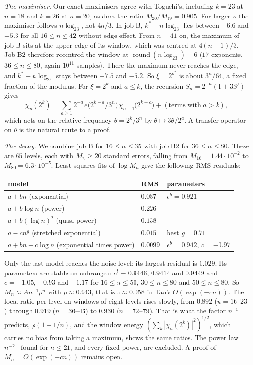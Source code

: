 \documentclass[11pt]{article}
\theoremstyle{remark}
\begin{document}
\emph{The maximiser.} Our exact maximisers agree with Toguchi's, including $k=23$ at $n=18$ and $k=26$ at $n=20$, as does the ratio $M_{20}/M_{19}=0.905$. For larger $n$ the maximiser follows $n\log_23$, not $4n/3$. In job B, $k^*-n\log_23$ lies between $-6.6$ and $-5.3$ for all $16\le n\le42$ without edge effect. From $n=41$ on, the maximum of job B sits at the upper edge of its window, which was centred at $4(n-1)/3$. Job B2 therefore recentred the window at $\operatorname{round}(n\log_23)-6$ ($17$ exponents, $36\le n\le80$, again $10^{11}$ samples). There the maximum never reaches the edge, and $k^*-n\log_23$ stays between $-7.5$ and $-5.2$. So $\xi=2^{k^*}$ is about $3^n/64$, a fixed fraction of the modulus. For $\xi=2^k$ and $a\le k$, the recursion $S_n=2^{-a}(1+3S')$ gives
\[
 \chi_n(2^k)=\sum_{a\ge1}2^{-a}\,e\bigl(2^{k-a}/3^n\bigr)\,\chi_{n-1}\bigl(2^{k-a}\bigr)+(\text{terms with }a>k),
\]
which acts on the relative frequency $\theta=2^k/3^n$ by $\theta\mapsto3\theta/2^a$. A transfer operator on $\theta$ is the natural route to a proof.

\emph{The decay.} We combine job B for $16\le n\le35$ with job B2 for $36\le n\le80$. These are $65$ levels, each with $M_n\ge20$ standard errors, falling from $M_{16}=1.44\cdot10^{-2}$ to $M_{80}=6.3\cdot10^{-5}$. Least-squares fits of $\log M_n$ give the following RMS residuals:
\begin{center}
\begin{tabular}{@{}lll@{}}
\toprule
model & RMS & parameters\\
\midrule
$a+bn$ (exponential) & $0.087$ & $e^b=0.921$\\
$a+b\log n$ (power) & $0.226$ & \\
$a+b(\log n)^2$ (quasi-power) & $0.138$ & \\
$a-cn^g$ (stretched exponential) & $0.015$ & best $g=0.71$\\
$a+bn+c\log n$ (exponential times power) & $0.0099$ & $e^b=0.942$, $c=-0.97$\\
\bottomrule
\end{tabular}
\end{center}
Only the last model reaches the noise level; its largest residual is $0.029$. Its parameters are stable on subranges: $e^b=0.9446$, $0.9414$ and $0.9449$ and $c=-1.05$, $-0.93$ and $-1.17$ for $16\le n\le50$, $30\le n\le80$ and $50\le n\le80$. So $M_n\approx An^{-1}\rho^n$ with $\rho\approx0.943$, that is $c\approx0.058$ in Tao's $O(\exp(-cn))$. The local ratio per level on windows of eight levels rises slowly, from $0.892$ ($n=16$--$23$) through $0.919$ ($n=36$--$43$) to $0.930$ ($n=72$--$79$). That is what the factor $n^{-1}$ predicts, $\rho(1-1/n)$, and the window energy $(\sum_k|\chi_n(2^k)|^2)^{1/2}$, which carries no bias from taking a maximum, shows the same ratios. The power law $n^{-2.1}$ found for $n\le21$, and every fixed power, are excluded. A proof of $M_n=O(\exp(-cn))$ remains open.
\end{document}
